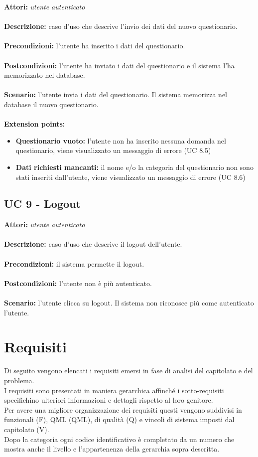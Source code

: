 \documentclass[a4paper,11pt]{article}
\begin{document}
\textbf{Attori:} \textit{utente autenticato}
\\ \\
\textbf{Descrizione:} caso d'uso che descrive l'invio dei dati del nuovo questionario.\\
\\
\textbf{Precondizioni:} l'utente ha inserito i dati del questionario.\\
\\
\textbf{Postcondizioni:} l’utente ha inviato i dati del questionario e il sistema l'ha memorizzato nel database.\\
\\
\textbf{Scenario:} l’utente invia i dati del questionario. Il sistema memorizza nel database il nuovo questionario.\\
\\
\textbf{Extension points:} 
\begin{itemize}
	\item \textbf{Questionario vuoto:} l'utente non ha inserito nessuna domanda nel questionario, viene visualizzato un messaggio di errore (UC 8.5)
	\item \textbf{Dati richiesti mancanti:} il nome e/o la categoria del questionario non sono stati inseriti dall'utente, viene visualizzato un messaggio di errore (UC 8.6)
\end{itemize}


\subsection{UC 9 - Logout}

\textbf{Attori:} \textit{utente autenticato}
\\ \\
\textbf{Descrizione:} caso d'uso che descrive il logout dell'utente.\\
\\
\textbf{Precondizioni:} il sistema permette il logout.\\
\\
\textbf{Postcondizioni:} l’utente non è più autenticato.\\
\\
\textbf{Scenario:} l’utente clicca su logout. Il sistema non riconosce più come autenticato l'utente.\\

	
	
	
	\newpage
	\section{Requisiti}
		Di seguito vengono elencati i requisiti emersi in fase di analisi del capitolato e del problema.\\
		I requisiti sono presentati in maniera gerarchica affinché i sotto-requisiti specifichino ulteriori informazioni e dettagli rispetto al loro genitore.\\
		Per avere una migliore organizzazione dei requisiti questi vengono suddivisi in funzionali (F), QML (QML), di qualità (Q) e vincoli di sistema imposti dal capitolato (V).\\
		Dopo la categoria ogni codice identificativo è completato da un numero che mostra anche il livello e l'appartenenza della gerarchia sopra descritta.\\
\end{document}
